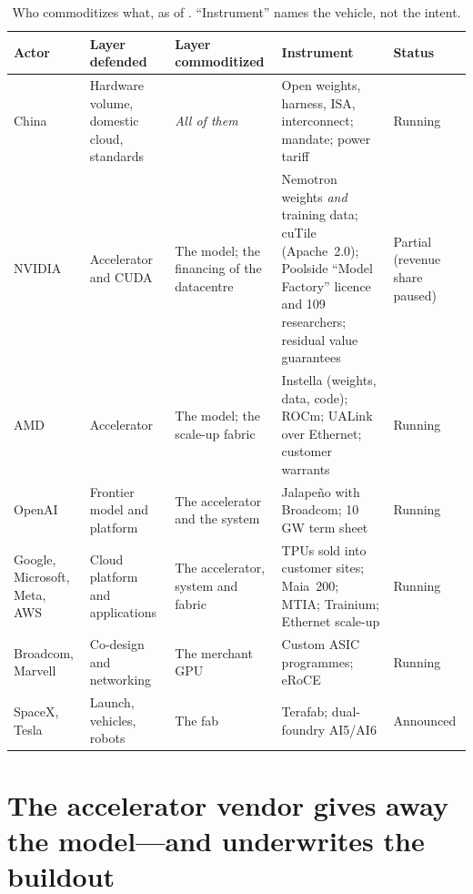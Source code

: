\begin{table}[htbp]
\centering\footnotesize
\caption{Who commoditizes what, as of \datafreeze. ``Instrument'' names the vehicle, not the intent.}
\label{tab:mirror}
\begin{tabular}{@{}p{20mm}p{28mm}p{28mm}p{46mm}p{14mm}@{}}
\toprule
\textbf{Actor} & \textbf{Layer defended} & \textbf{Layer commoditized} & \textbf{Instrument} & \textbf{Status} \\
\midrule
China & Hardware volume, domestic cloud, standards & \emph{All of them} & Open weights, harness, ISA, interconnect; mandate; power tariff & Running \\
NVIDIA & Accelerator and CUDA & The model; the financing of the datacentre & Nemotron weights \emph{and} training data; cuTile (Apache~2.0); Poolside ``Model Factory'' licence and 109 researchers; residual value guarantees & Partial (revenue share paused) \\
AMD & Accelerator & The model; the scale-up fabric & Instella (weights, data, code); ROCm; UALink over Ethernet; customer warrants & Running \\
OpenAI & Frontier model and platform & The accelerator and the system & Jalape\~no with Broadcom; 10\,GW term sheet & Running \\
Google, Microsoft, Meta, AWS & Cloud platform and applications & The accelerator, system and fabric & TPUs sold into customer sites; Maia~200; MTIA; Trainium; Ethernet scale-up & Running \\
Broadcom, Marvell & Co-design and networking & The merchant GPU & Custom ASIC programmes; eRoCE & Running \\
SpaceX, Tesla & Launch, vehicles, robots & The fab & Terafab; dual-foundry AI5/AI6 & Announced \\
\bottomrule
\end{tabular}
\end{table}

\section{The accelerator vendor gives away the model---and underwrites the buildout}

